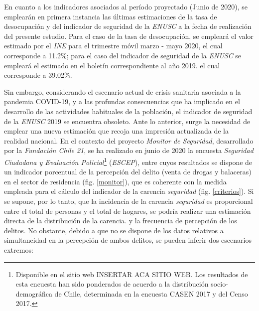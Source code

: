 \documentclass[12pt,letterpaper,spanish]{article}
\begin{document}
En cuanto a los indicadores asociados al período proyectado (Junio de 2020), se emplearán en primera instancia las últimas estimaciones de la tasa de desocupación y del indicador de seguridad de la \textit{ENUSC} a la fecha de realización del presente estudio. Para el caso de la tasa de desocupación, se empleará el valor estimado por el \textit{INE} para el trimestre móvil marzo - mayo 2020, el cual corresponde a 11.2\%; para el caso del indicador de seguridad de la \textit{ENUSC} se empleará el estimado en el boletín correspondiente al año 2019. el cual corresponde a 39.02\%.

Sin embargo, considerando el escenario actual de crisis sanitaria asociada a la pandemia COVID-19, y a las  profundas consecuencias que ha implicado en el desarrollo de las actividades habituales de la población, el indicador de seguridad de la \textit{ENUSC} 2019 se encuentra obsoleto. Ante lo anterior, surge la necesidad de emplear una nueva estimación que recoja una impresión actualizada de la realidad nacional. En el contexto del proyecto \textit{Monitor de Seguridad}, desarrollado por la \textit{Fundación Chile 21}, se ha realizado en junio de 2020 la encuesta \textit{Seguridad Ciudadana y Evaluación Policial}\footnote{Disponible en el sitio web INSERTAR ACA SITIO WEB. Los resultados de esta encuesta han sido ponderados de acuerdo a la distribución socio-demográfica de Chile, determinada en la encuesta CASEN 2017 y del Censo 2017.} (\textit{ESCEP}), entre cuyos resultados se dispone de un indicador porcentual de la percepción del delito (venta de drogas y balaceras) en el sector de residencia (fig. \ref{monitor}), que es coherente con la medida empleada para el cálculo del indicador de la carencia \textit{seguridad} (fig. \ref{criterios}). Si se supone, por lo tanto, que la incidencia de la carencia \textit{seguridad} es proporcional entre el total de personas y el total de hogares, se podría realizar una estimación directa de la distribución de la carencia. y la frecuencia de percepción de los delitos. No obstante, debido a que no se dispone de los datos relativos a simultaneidad en la percepción de ambos delitos, se pueden inferir dos escenarios extremos: 
\end{document}
